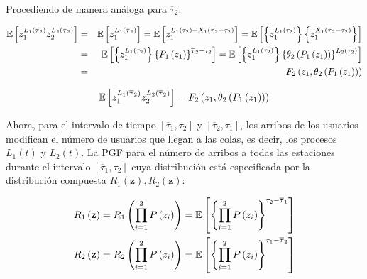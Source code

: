 Procediendo de manera an\'aloga para $\overline{\tau}_{2}$:

\begin{eqnarray*}
\mathbb{E}\left[z_{1}^{L_{1}\left(\overline{\tau}_{2}\right)}z_{2}^{L_{2}\left(\overline{\tau}_{2}\right)}\right]&=&\mathbb{E}\left[z_{1}^{L_{1}\left(\overline{\tau}_{2}\right)}\right]=\mathbb{E}\left[z_{1}^{L_{1}\left(\tau_{2}\right)+X_{1}\left(\overline{\tau}_{2}-\tau_{2}\right)}\right]=\mathbb{E}\left[\left\{z_{1}^{L_{1}\left(\tau_{2}\right)}\right\}\left\{z_{1}^{X_{1}\left(\overline{\tau}_{2}-\tau_{2}\right)}\right\}\right]\\
&=&\mathbb{E}\left[\left\{z_{1}^{L_{1}\left(\tau_{2}\right)}\right\}\left\{P_{1}\left(z_{1}\right)\right\}^{\overline{\tau}_{2}-\tau_{2}}\right]=\mathbb{E}\left[\left\{z_{1}^{L_{1}\left(\tau_{2}\right)}\right\}\left\{\theta_{2}\left(P_{1}\left(z_{1}\right)\right)\right\}^{L_{2}\left(\tau_{2}\right)}\right]\\
&=&F_{2}\left(z_{1},\theta_{2}\left(P_{1}\left(z_{1}\right)\right)\right)
\end{eqnarray*}%


\begin{equation}\label{Eq.PGF.Conjunta.Tau2}
\mathbb{E}\left[z_{1}^{L_{1}\left(\overline{\tau}_{2}\right)}z_{2}^{L_{2}\left(\overline{\tau}_{2}\right)}\right]=F_{2}\left(z_{1},\theta_{2}\left(P_{1}\left(z_{1}\right)\right)\right)
\end{equation}%

Ahora, para el intervalo de tiempo
$\left[\overline{\tau}_{1},\tau_{2}\right]$ y
$\left[\overline{\tau}_{2},\tau_{1}\right]$, los arribos de los
usuarios modifican el n\'umero de usuarios que llegan a las colas,
es decir, los procesos
$L_{1}\left(t\right)$
y $L_{2}\left(t\right)$. La PGF para el n\'umero de arribos
a todas las estaciones durante el intervalo
$\left[\overline{\tau}_{1},\tau_{2}\right]$  cuya distribuci\'on
est\'a especificada por la distribuci\'on compuesta
$R_{1}\left(\mathbf{z}\right),R_{2}\left(\mathbf{z}\right)$:

\begin{eqnarray*}
R_{1}\left(\mathbf{z}\right)=R_{1}\left(\prod_{i=1}^{2}P\left(z_{i}\right)\right)=\mathbb{E}\left[\left\{\prod_{i=1}^{2}P\left(z_{i}\right)\right\}^{\tau_{2}-\overline{\tau}_{1}}\right]\\
R_{2}\left(\mathbf{z}\right)=R_{2}\left(\prod_{i=1}^{2}P\left(z_{i}\right)\right)=\mathbb{E}\left[\left\{\prod_{i=1}^{2}P\left(z_{i}\right)\right\}^{\tau_{1}-\overline{\tau}_{2}}\right]\\
\end{eqnarray*}


